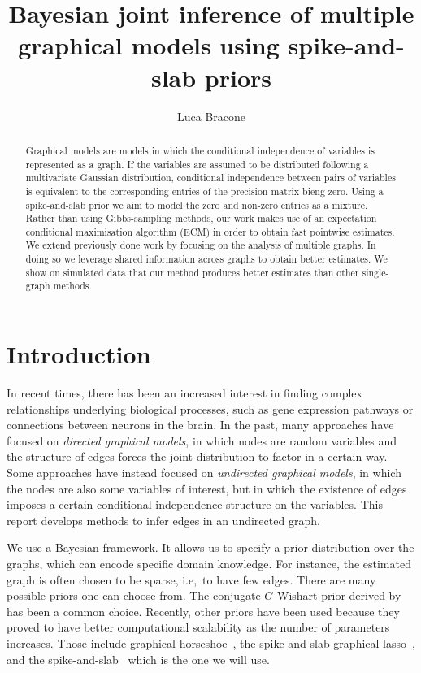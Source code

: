 \documentclass[a4paper, 11pt, oneside]{report}
\author{Luca Bracone}
\title{Bayesian joint inference of multiple graphical models using
	spike-and-slab priors}
\newcommand{\1}{\mathds{1}}
\begin{document}
\maketitle

\begin{abstract}
	Graphical models are models in which the conditional independence of
	variables is represented as a graph. If the variables are assumed to be
	distributed following a multivariate Gaussian distribution, conditional
	independence between pairs of variables is equivalent to the corresponding entries of the precision matrix bieng zero. Using a
	spike-and-slab prior we aim to model the zero and
	non-zero entries as a mixture. Rather than using Gibbs-sampling methods, our work makes
	use of an expectation conditional maximisation algorithm (ECM) in order to
	obtain fast pointwise estimates. We extend previously done work by focusing
	on the analysis of multiple graphs. In doing so we leverage shared
	information across graphs to obtain better estimates. We show on simulated
	data that our method produces better estimates than other single-graph
	methods.
\end{abstract}

\chapter{Introduction}
In recent times, there has been an increased interest in finding complex
relationships underlying biological processes, such as gene expression pathways
or connections between neurons in the brain. In the past, many approaches have
focused on \emph{directed graphical models}, in which nodes are random
variables and the structure of edges forces the joint distribution to factor in
a certain way. Some approaches have instead focused on \emph{undirected
	graphical models}, in which the nodes are also some variables of interest, but
in which the existence of edges imposes a certain conditional independence
structure on the variables. This report develops methods to infer edges in an
undirected graph.

We use a Bayesian framework. It allows us to specify a prior distribution over the
graphs, which can encode specific domain knowledge. For instance, the estimated
graph is often chosen to be sparse, i.e,\ to have few edges.
There are many possible priors one can choose from.
The conjugate $G$-Wishart prior derived by~\citet{HyperInverseWRovera2002}
has been a common choice.
Recently, other priors have been used because they proved to have
better computational scalability as the number of parameters increases.
Those include graphical horseshoe~\citep{yunf2019}, the spike-and-slab
graphical lasso~\citep{limm2018}, and the
spike-and-slab~\citep{wang-2015} which is the one we will use.
\end{document}
